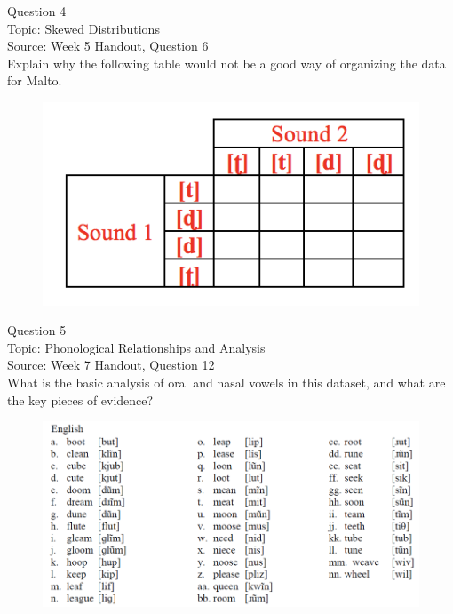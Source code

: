 \documentclass[12pt]{article}
\begin{document}
\newpage

{\large Question 4}\\

Topic: Skewed Distributions\\
Source: Week 5 Handout, Question 6\\

Explain why the following table would not be a good way of organizing the data for Malto.\\

\begin{figure}[H]
\includegraphics{../images/Malto_table_bad.png}
\end{figure}

\newpage

{\large Question 5}\\

Topic: Phonological Relationships and Analysis\\
Source: Week 7 Handout, Question 12\\

What is the basic analysis of oral and nasal vowels in this dataset, and what are the key pieces of evidence?\\

\begin{figure}[H]
\includegraphics{../images/english12.png}
\end{figure}
\end{document}
